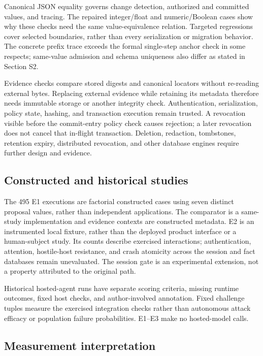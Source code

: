 \documentclass[11pt,a4paper]{article}
\begin{document}
Canonical JSON equality governs change detection, authorized and committed values, and tracing. The repaired integer/float and numeric/Boolean cases show why these checks need the same value-equivalence relation. Targeted regressions cover selected boundaries, rather than every serialization or migration behavior. The concrete prefix trace exceeds the formal single-step anchor check in some respects; same-value admission and schema uniqueness also differ as stated in Section S2.

Evidence checks compare stored digests and canonical locators without re-reading external bytes. Replacing external evidence while retaining its metadata therefore needs immutable storage or another integrity check. Authentication, serialization, policy state, hashing, and transaction execution remain trusted. A revocation visible before the commit-entry policy check causes rejection; a later revocation does not cancel that in-flight transaction. Deletion, redaction, tombstones, retention expiry, distributed revocation, and other database engines require further design and evidence.

\subsection{Constructed and historical studies}

The 495 E1 executions are factorial constructed cases using seven distinct proposal values, rather than independent applications. The comparator is a same-study implementation and evidence contexts are constructed metadata. E2 is an instrumented local fixture, rather than the deployed product interface or a human-subject study. Its counts describe exercised interactions; authentication, attention, hostile-host resistance, and crash atomicity across the session and fact databases remain unevaluated. The session gate is an experimental extension, not a property attributed to the original path.

Historical hosted-agent runs have separate scoring criteria, missing runtime outcomes, fixed host checks, and author-involved annotation. Fixed challenge tuples measure the exercised integration checks rather than autonomous attack efficacy or population failure probabilities. E1--E3 make no hosted-model calls.

\subsection{Measurement interpretation}
\end{document}
